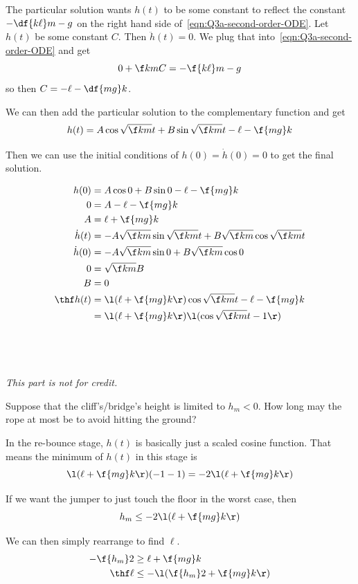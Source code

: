 \documentclass[a4paper]{article}
\begin{document}
The particular solution wants $h(t)$ to be some constant to reflect the constant $-\df{k\ell}m - g$ on the right hand side of~\eqref{eqn:Q3a-second-order-ODE}. Let $h(t)$ be some constant $C$. Then $\ddot h(t) = 0$. We plug that into~\eqref{eqn:Q3a-second-order-ODE} and get \[
0 + \f km C = - \f{k\ell}m - g
\] so then $C = -\ell - \df{mg}k$.

We can then add the particular solution to the complementary function and get \[ h(t) = A \cos \sqrt{\f km} t + B \sin \sqrt{\f km } t - \ell - \f{mg}k \]

Then we can use the initial conditions of $h(0) = \dot h(0) = 0$ to get the final solution.

\begin{align*}
h(0) &= A \cos 0 + B \sin 0 - \ell - \f{mg}k \\
0 &= A - \ell - \f{mg}k \\
A &= \ell + \f{mg}k \\
\dot h(t) &= -A \sqrt{\f km} \sin \sqrt{\f km} t + B \sqrt{\f km} \cos \sqrt{\f km} t \\
\dot h(0) &= -A \sqrt{\f km} \sin 0 + B \sqrt{\f km} \cos 0 \\
0 &= \sqrt{\f km} B \\
B &= 0 \\
\thf h(t) &= \l( \ell + \f{mg}k \r) \cos \sqrt{\f km} t - \ell - \f{mg}k \\
&= \l( \ell + \f{mg}k \r) \l( \cos \sqrt{\f km} t - 1 \r)
\end{align*}

\subsection{~} %

\begin{questionbody}
\textit{This part is not for credit.}

Suppose that the cliff's/bridge's height is limited to $h_m < 0$. How long may the rope at most be to avoid hitting the ground?
\end{questionbody}

In the re-bounce stage, $h(t)$ is basically just a scaled cosine function. That means the minimum of $h(t)$ in this stage is \[ \l( \ell + \f{mg}k \r) (-1 - 1) = -2 \l( \ell + \f{mg}k \r) \]

If we want the jumper to just touch the floor in the worst case, then \[ h_m \le -2\l( \ell + \f{mg}k \r) \]

We can then simply rearrange to find $\ell$.
\begin{align*}
-\f{h_m}2 &\ge \ell + \f{mg}k \\
\thf \ell &\le -\l( \f{h_m}2 + \f{mg}k \r)
\end{align*}

\end{document}
